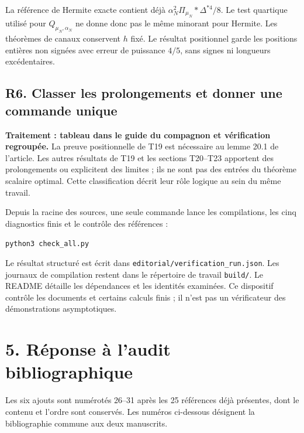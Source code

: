 \documentclass[11pt,a4paper]{article}
\begin{document}
La référence de Hermite exacte contient déjà
\(\alpha_N^2\Pi_{\mu_N}*\Delta^{*4}/8\). Le test quartique utilisé
pour \(Q_{\mu_N,\alpha_N}\) ne donne donc pas le même minorant
pour Hermite. Les théorèmes de canaux conservent \(h\) fixé.
Le résultat positionnel garde les positions entières non signées
avec erreur de puissance \(4/5\), sans signes ni longueurs excédentaires.

\subsection*{R6. Classer les prolongements et donner une commande unique}
\textbf{Traitement : tableau dans le guide du compagnon et vérification regroupée.}
La preuve positionnelle de T19 est nécessaire au lemme 20.1 de l'article.
Les autres résultats de T19 et les sections T20--T23 apportent des
prolongements ou explicitent des limites ; ils ne sont pas des entrées
du théorème scalaire optimal. Cette classification décrit leur rôle
logique au sein du même travail.

Depuis la racine des sources, une seule commande lance les compilations,
les cinq diagnostics finis et le contrôle des références :
\begin{center}
\texttt{python3 check\_all.py}
\end{center}
Le résultat structuré est écrit dans
\texttt{editorial/verification\_run.json}. Les journaux de compilation
restent dans le répertoire de travail \texttt{build/}.
Le README détaille les dépendances et les identités examinées.
Ce dispositif contrôle les documents et certains calculs finis ; il
n'est pas un vérificateur des démonstrations asymptotiques.

\clearpage
\section*{5. Réponse à l'audit bibliographique}
Les six ajouts sont numérotés 26--31 après les 25 références déjà
présentes, dont le contenu et l'ordre sont conservés. Les numéros
ci-dessous désignent la bibliographie commune aux deux manuscrits.
\end{document}
